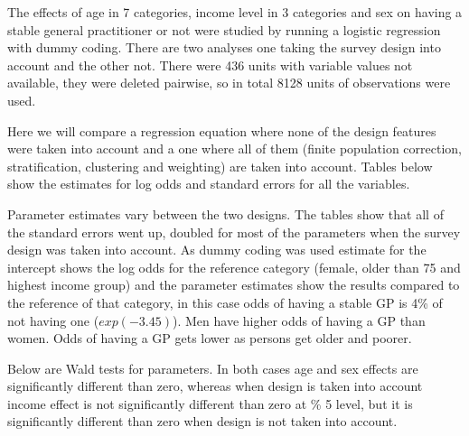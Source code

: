 The effects of age in 7 categories, income level in 3 categories and sex on having a stable general practitioner or not were studied by running a logistic regression with dummy coding. There are two analyses one taking the survey design into account and the other not. There were 436 units with variable values not available, they were deleted pairwise, so in total 8128 units of observations were used.

Here we will compare a regression equation where none of the design features were taken into account and a one where all of them (finite population correction, stratification, clustering and weighting) are taken into account. Tables below show the estimates for log odds and standard errors for all the variables.





Parameter estimates vary between the two designs. The tables show that all of the standard errors went up, doubled for most of the parameters when the survey design was taken into account. As dummy coding was used estimate for the intercept shows the log odds for the reference category (female, older than 75 and highest income group) and the parameter estimates show the results compared to the reference of that category, in this case odds of having a stable GP is 4\% of not having one ($exp(-3.45)$). Men have higher odds of having a GP than women. Odds of having a GP gets lower as persons get older and poorer.

Below are Wald tests for parameters. In both cases age and sex effects are significantly different than zero, whereas when design is taken into account income effect is not significantly different than zero at \% 5 level, but it is significantly different than zero when design is not taken into account. 



